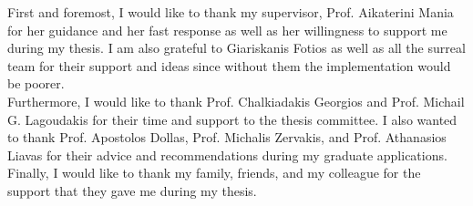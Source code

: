 First and foremost, I would like to thank my supervisor, Prof. Aikaterini Mania for her guidance and her fast response as well as her willingness to support me during my thesis. I am also grateful to Giariskanis Fotios as well as all the surreal team for their support and ideas since without them the implementation would be poorer. \\

Furthermore, I would like to thank Prof. Chalkiadakis Georgios and Prof. Michail G. Lagoudakis for their time and support to the thesis committee. I also wanted to thank Prof. Apostolos Dollas, Prof. Michalis Zervakis, and Prof. Athanasios Liavas for their advice and recommendations during my graduate applications. \\

Finally, I would like to thank my family, friends, and my colleague for the support that they gave me during my thesis. 